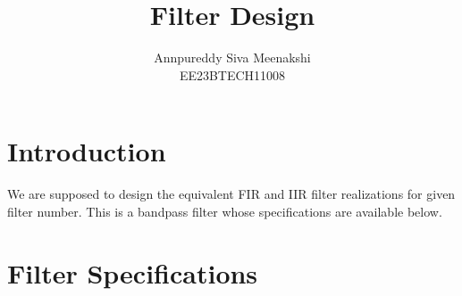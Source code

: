 \documentclass{article}
\begin{document}
\title{ \textbf{Filter Design}}

\author{Annpureddy Siva Meenakshi\\EE23BTECH11008}
\date{}

\maketitle
\section{Introduction}
We are supposed to design the equivalent FIR and IIR filter realizations for given filter number.  
This is a bandpass filter whose specifications are available below.

\section{Filter Specifications}
\end{document}
